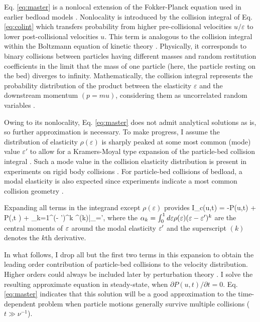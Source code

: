 Eq. \ref{eq:master} is a nonlocal extension of the Fokker-Planck equation used in earlier bedload models \citep{Fan2014,Ancey2014}. 
Nonlocality is introduced by the collision integral of Eq. \ref{eq:colint} which transfers probability from higher pre-collisional velocities $u/\varepsilon$ to lower post-collisional velocities $u$.
This term is analogous to the collision integral within the Boltzmann equation of kinetic theory \citep{Duderstadt1979, Brilliantov2004}. Physically, it corresponds to binary collisions between particles having different masses and random restitution coefficients \citep[cf.][]{Serero2015} in the limit that the mass of one particle (here, the particle resting on the bed) diverges to infinity.
Mathematically, the collision integral represents the probability distribution of the product between the elasticity $\varepsilon$ and the downstream momentum $(p = m u)$, considering them as uncorrelated random variables \citep[cf.][]{Feller1968}.


Owing to its nonlocality, Eq. \ref{eq:master} does not admit analytical solutions as is, so further approximation is necessary.
To make progress, I assume the distribution of elasticity $\rho(\varepsilon)$ is sharply peaked at some most common (mode) value $\varepsilon'$ to allow for a Kramers-Moyal type expansion of the particle-bed collision integral \citep[e.g.][]{Gardiner1983}.
Such a mode value in the collision elasticity distribution is present in experiments on rigid body collisions \citep{Glielmo2014}.
For particle-bed collisions of bedload, a modal elasticity is also expected since experiments indicate a most common collision geometry \citep[e.g.][]{Gordon1972,Martin2013}.

Expanding all terms in the integrand except $\rho(\varepsilon)$ provides
\be I_c(u,t) = -P(u,t) + P\big(,t \big) + \sum_{k=1}^\infty {}(\ve - \ve')^k ^{(k)}\Big|_{\ve=\ve'},\label{eq:expansion}\ee
where the $\alpha_k = \int_0^1 d\varepsilon \rho(\varepsilon) (\varepsilon-\varepsilon')^k $ are the central moments of $\varepsilon$ around the modal elasticity $\varepsilon'$ and the superscript $(k)$ denotes the $k$th derivative.

In what follows, I drop all but the first two terms in this expansion to obtain the leading order contribution of particle-bed collisions to the velocity distribution.
Higher orders could always be included later by perturbation theory \citep{Morse1953a}.
I solve the resulting approximate equation in steady-state, when $\partial P(u,t)/\partial t = 0$. Eq. \ref{eq:master} indicates that this solution will be a good approximation to the time-dependent problem when particle motions generally survive multiple collisions ($t\gg \nu^{-1}$).

